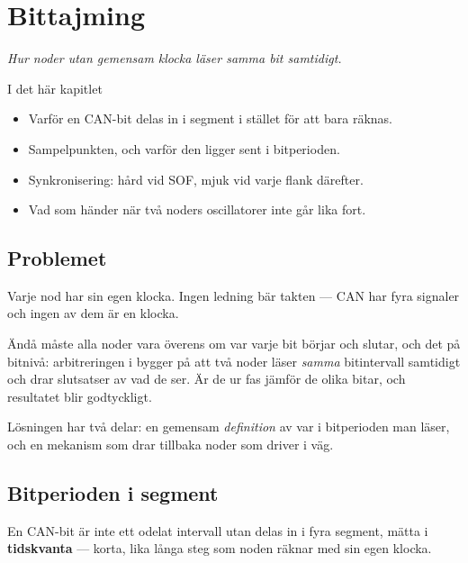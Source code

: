 \chapter{Bittajming}
\label{ch:tajming}

{\large\itshape Hur noder utan gemensam klocka läser samma bit samtidigt.\par}

\begin{chapterbox}{I det här kapitlet}
\begin{itemize}
  \item Varför en CAN-bit delas in i segment i stället för att bara räknas.
  \item Sampelpunkten, och varför den ligger sent i bitperioden.
  \item Synkronisering: hård vid SOF, mjuk vid varje flank därefter.
  \item Vad som händer när två noders oscillatorer inte går lika fort.
\end{itemize}
\end{chapterbox}

\section{Problemet}

Varje nod har sin egen klocka. Ingen ledning bär takten --- CAN har fyra signaler och ingen av dem
är en klocka.

Ändå måste alla noder vara överens om var varje bit börjar och slutar, och det på bitnivå:
arbitreringen i  bygger på att två noder läser \emph{samma} bitintervall
samtidigt och drar slutsatser av vad de ser. Är de ur fas jämför de olika bitar, och resultatet
blir godtyckligt.

Lösningen har två delar: en gemensam \emph{definition} av var i bitperioden man läser, och en
mekanism som drar tillbaka noder som driver i väg.

\section{Bitperioden i segment}

En CAN-bit är inte ett odelat intervall utan delas in i fyra segment, mätta i
\textbf{tidskvanta} --- korta, lika långa steg som noden räknar med sin egen klocka.


